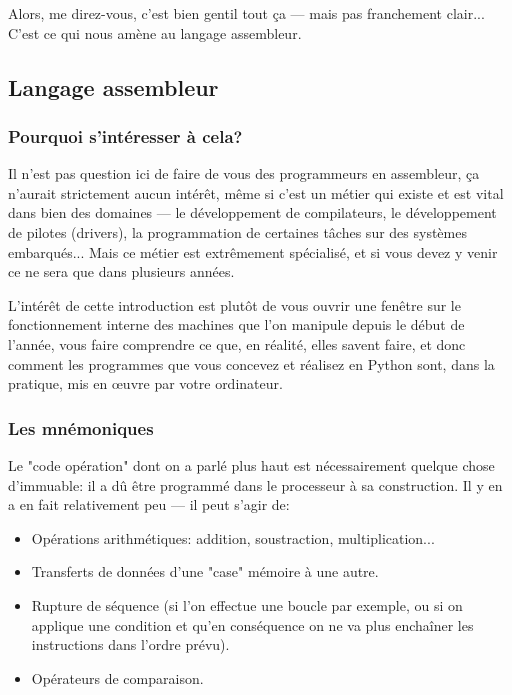 \documentclass[12pt]{article}
\begin{document}
	 Alors, me direz-vous, c'est bien gentil tout ça --- mais pas franchement clair... C'est ce qui nous amène au langage assembleur.
	 
	 \subsection{Langage assembleur}
	 
	 \subsubsection*{Pourquoi s'intéresser à cela?}
	
	Il n'est pas question ici de faire de vous des programmeurs en assembleur, ça n'aurait strictement aucun intérêt, même si c'est un métier qui existe et est vital dans bien des domaines --- le développement de compilateurs, le développement de pilotes (drivers), la programmation de certaines tâches sur des systèmes embarqués... Mais ce métier est extrêmement spécialisé, et si vous devez y venir ce ne sera que dans plusieurs années.
	
	L'intérêt de cette introduction est plutôt de vous ouvrir une fenêtre sur le fonctionnement interne des machines que l'on manipule depuis le début de l'année, vous faire comprendre ce que, en réalité, elles savent faire, et donc comment les programmes que vous concevez et réalisez en Python sont, dans la pratique, mis en œuvre par votre ordinateur.
	
	\subsubsection*{Les mnémoniques}
	
	 Le "code opération" dont on a parlé plus haut est nécessairement quelque chose d'immuable: il a dû être programmé dans le processeur à sa construction. Il y en a en fait relativement peu --- il peut s'agir de:
	 \begin{itemize}
	 	\item Opérations arithmétiques: addition, soustraction, multiplication...
	 	\item Transferts de données d'une "case" mémoire à une autre.
	 	\item Rupture de séquence (si l'on effectue une boucle par exemple, ou si on applique une condition et qu'en conséquence on ne va plus enchaîner les instructions dans l'ordre prévu).
	 	\item Opérateurs de comparaison.
	 \end{itemize}
	 
\end{document}
